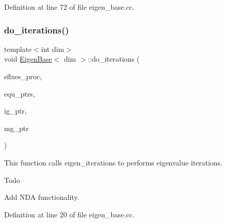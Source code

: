 Definition at line 72 of file eigen\+\_\+base.\+cc.

\mbox{\label{class_eigen_base_a8a9ef8878e5b7199aa662f2b61b2d864}} 
\subsubsection{\texorpdfstring{do\+\_\+iterations()}{do\_iterations()}}
{\footnotesize\ttfamily template$<$int dim$>$ \\
void \hyperlink{class_eigen_base}{Eigen\+Base}$<$ dim $>$\+::do\+\_\+iterations (\begin{DoxyParamCaption}\item[{std\+::vector$<$ Vector$<$ double $>$ $>$ \&}]{sflxes\+\_\+proc,  }\item[{std\+::vector$<$ std\+\_\+cxx11\+::shared\+\_\+ptr$<$ \hyperlink{class_equation_base}{Equation\+Base}$<$ dim $>$ $>$ $>$ \&}]{equ\+\_\+ptrs,  }\item[{std\+\_\+cxx11\+::shared\+\_\+ptr$<$ \hyperlink{class_i_g_base}{I\+G\+Base}$<$ dim $>$ $>$}]{ig\+\_\+ptr,  }\item[{std\+\_\+cxx11\+::shared\+\_\+ptr$<$ \hyperlink{class_m_g_base}{M\+G\+Base}$<$ dim $>$ $>$}]{mg\+\_\+ptr }\end{DoxyParamCaption})\hspace{0.3cm}{\ttfamily [virtual]}}

This function calls eigen\+\_\+iterations to performs eigenvalue iterations.

\begin{DoxyRefDesc}{Todo}
\item[\hyperlink{todo__todo000002}{Todo}]Add N\+DA functionality. \end{DoxyRefDesc}


Definition at line 20 of file eigen\+\_\+base.\+cc.

\mbox{\label{class_eigen_base_ae09830ed4bcb14b7b699cd5f5460fab7}} 
